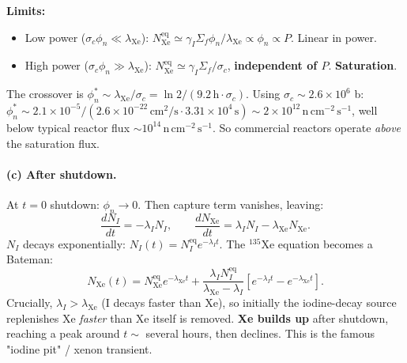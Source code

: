 \documentclass[11pt]{article}
\begin{document}
\textbf{Limits:}
\begin{itemize}[itemsep=1pt]
\item Low power ($\sigma_c\phi_n\ll\lambda_\mathrm{Xe}$): $N_\mathrm{Xe}^\mathrm{eq}\simeq\gamma_I\Sigma_f\phi_n/\lambda_\mathrm{Xe}\propto\phi_n\propto P$. Linear in power.
\item High power ($\sigma_c\phi_n\gg\lambda_\mathrm{Xe}$): $N_\mathrm{Xe}^\mathrm{eq}\simeq\gamma_I\Sigma_f/\sigma_c$, \textbf{independent of $P$}. \textbf{Saturation}.
\end{itemize}

The crossover is $\phi_n^*\sim\lambda_\mathrm{Xe}/\sigma_c=\ln 2/(9.2\,\mathrm{h}\cdot\sigma_c)$. Using $\sigma_c\sim 2.6\times 10^{6}$ b: $\phi_n^*\sim 2.1\times 10^{-5}/(2.6\times 10^{-22}\,\mathrm{cm}^{2}/\mathrm{s}\cdot 3.31\times 10^{4}\,\mathrm{s})\sim 2\times 10^{12}\,\mathrm{n\,cm^{-2}\,s^{-1}}$, well below typical reactor flux $\sim 10^{14}\,\mathrm{n\,cm^{-2}\,s^{-1}}$. So commercial reactors operate \emph{above} the saturation flux.

\paragraph{(c) After shutdown.} At $t=0$ shutdown: $\phi_n\to 0$. Then capture term vanishes, leaving:
\[
\frac{dN_I}{dt}=-\lambda_I N_I,\qquad\frac{dN_\mathrm{Xe}}{dt}=\lambda_I N_I-\lambda_\mathrm{Xe} N_\mathrm{Xe}.
\]
$N_I$ decays exponentially: $N_I(t)=N_I^\mathrm{eq}e^{-\lambda_I t}$. The $^{135}$Xe equation becomes a Bateman:
\[
N_\mathrm{Xe}(t)=N_\mathrm{Xe}^\mathrm{eq}e^{-\lambda_\mathrm{Xe}t}+\frac{\lambda_I N_I^\mathrm{eq}}{\lambda_\mathrm{Xe}-\lambda_I}\!\left[e^{-\lambda_I t}-e^{-\lambda_\mathrm{Xe}t}\right].
\]
Crucially, $\lambda_I>\lambda_\mathrm{Xe}$ (I decays faster than Xe), so initially the iodine-decay source replenishes Xe \emph{faster} than Xe itself is removed. \textbf{Xe builds up} after shutdown, reaching a peak around $t\sim$ several hours, then declines. This is the famous "iodine pit" / xenon transient.
\end{document}
